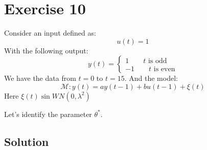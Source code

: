\section{Exercise 10}

Consider an input defined as:
\[u(t)=1\]
With the following output:
\[y(t)=\begin{cases}
    1 \qquad t \text{ is odd} \\
    -1 \qquad t \text{ is even} 
\end{cases}\]
We have the data from $t=0$ to $t=15$. 
And the model: 
\[\mathcal{M}:y(t)=ay(t-1)+bu(t-1)+\xi(t)\]
Here $\xi(t)\sin WN(0,\lambda^2)$

Let's identify the parameter $\theta^\ast$. 

\subsection*{Solution}
